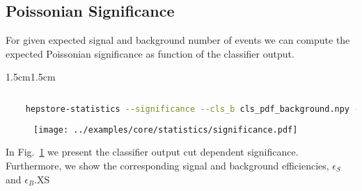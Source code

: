 \subsection{Poissonian Significance}
For given expected signal and background number of events we can
compute the expected Poissonian significance as function of the
classifier output.
%
\begin{changemargin}{1.5cm}{1.5cm} 
  \begin{lstlisting}[language=Bash]
    
    hepstore-statistics --significance --cls_b cls_pdf_background.npy --cls_s cls_pdf_signal.npy --xsec_s 0.5 --xsec_b 10. --luminosity 100.
  \end{lstlisting}
\end{changemargin}
%
%
\begin{figure}
  \centering
  \texttt{[image: ../examples/core/statistics/significance.pdf]}
  \caption{}
  \label{fig:example_statistics}
\end{figure}
%
In Fig.~\ref{fig:example_statistics} we present the classifier output
cut dependent significance. Furthermore, we show the corresponding
signal and background efficiencies, $\epsilon_S$ and $\epsilon_B$.XS


